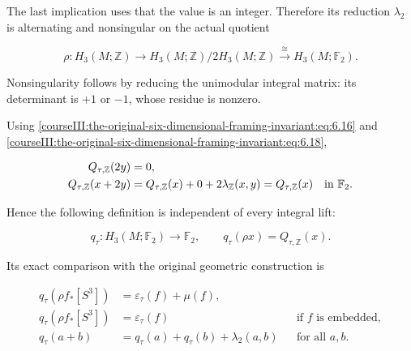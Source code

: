 The last implication uses that the value is an integer. Therefore its reduction \(\lambda_2\) is alternating and nonsingular on the actual quotient

\begin{equation}
\rho:H_3(M;\mathbb Z)\longrightarrow
          H_3(M;\mathbb Z)/2H_3(M;\mathbb Z)
               \xrightarrow{\ \cong\ }H_3(M;\mathbb F_2).
 \label{courseIII:the-original-six-dimensional-framing-invariant:eq:6.19}
\end{equation}

Nonsingularity follows by reducing the unimodular integral matrix: its determinant is \(+1\) or \(-1\), whose residue is nonzero.

Using \eqref{courseIII:the-original-six-dimensional-framing-invariant:eq:6.16} and \eqref{courseIII:the-original-six-dimensional-framing-invariant:eq:6.18},

\begin{equation}
\begin{split}
 Q_{\tau,\mathbb Z}(2y)&=0,\\
 Q_{\tau,\mathbb Z}(x+2y)
     &=Q_{\tau,\mathbb Z}(x)+0+2\lambda_{\mathbb Z}(x,y)
       =Q_{\tau,\mathbb Z}(x)\quad\hbox{in }\mathbb F_2.
 \end{split}
 \label{courseIII:the-original-six-dimensional-framing-invariant:eq:6.20}
\end{equation}

Hence the following definition is independent of every integral lift:

\begin{equation}
q_\tau:H_3(M;\mathbb F_2)\longrightarrow\mathbb F_2,\qquad
        q_\tau(\rho x)=Q_{\tau,\mathbb Z}(x).
 \label{courseIII:the-original-six-dimensional-framing-invariant:eq:6.21}
\end{equation}

Its exact comparison with the original geometric construction is

\begin{equation}
\begin{aligned}
 q_\tau(\rho f_*[S^3])&=\varepsilon_\tau(f)+\mu(f),\\
 q_\tau(\rho f_*[S^3])&=\varepsilon_\tau(f)
                                      &&\text{if }f\text{ is embedded},\\
 q_\tau(a+b)&=q_\tau(a)+q_\tau(b)+\lambda_2(a,b)
                                      &&\text{for all }a,b.
 \end{aligned}
 \label{courseIII:the-original-six-dimensional-framing-invariant:eq:6.22}
\end{equation}

